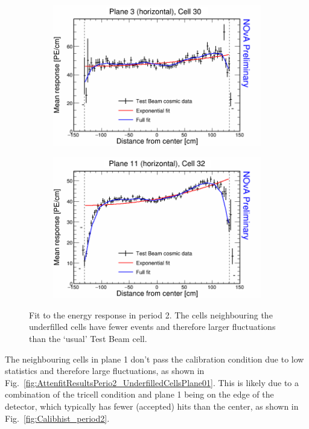 \begin{figure}[h]
  \begin{subfigure}{0.495\textwidth}
    \includegraphics[width=\linewidth]{Plots/RelativeCalibrationResults/p2_003_030.png}
  \end{subfigure}
  \begin{subfigure}{0.495\textwidth}
    \includegraphics[width=\linewidth]{Plots/RelativeCalibrationResults/p2_011_032.png}
  \end{subfigure}
  \caption[Attenuation fits for underfilled cells in period 2 data]{Fit to the energy response in period 2. The cells neighbouring the underfilled cells have fewer events and therefore larger fluctuations than the `usual' Test Beam cell.}
  \label{fig:AttenfitResultsPerio2_UnderfilledCells}
\end{figure}

The neighbouring cells in plane 1 don't pass the calibration condition due to low statistics and therefore large fluctuations, as shown in Fig.~\ref{fig:AttenfitResultsPerio2_UnderfilledCellsPlane01}. This is likely due to a combination of the tricell condition and plane 1 being on the edge of the detector, which typically has fewer (accepted) hits than the center, as shown in Fig.~\ref{fig:Calibhist_period2}.

